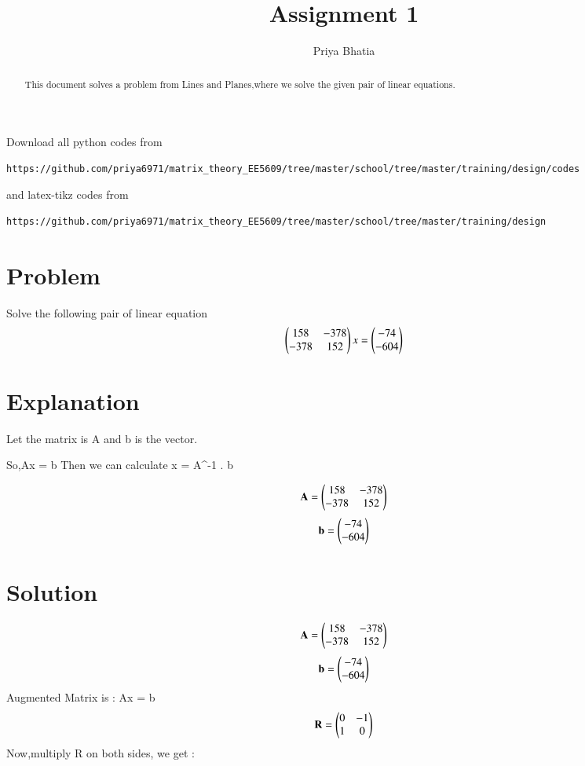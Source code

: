\documentclass[journal,12pt,twocolumn]{IEEEtran}
\begin{document}
     \def\rightbox#1{\makebox[0in][r]{#1}}
     \def\centbox#1{\makebox[0in]{#1}}
     \def\topbox#1{\raisebox{-\baselineskip}[0in][0in]{#1}}
     \def\midbox#1{\raisebox{-0.5\baselineskip}[0in][0in]{#1}}
\vspace{3cm}
\title{Assignment 1}
\author{Priya Bhatia}
\maketitle
\newpage
\bigskip
\renewcommand{\thefigure}{\theenumi}
\renewcommand{\thetable}{\theenumi}
\begin{abstract}
This document solves a problem from Lines and Planes,where we solve the given pair of linear equations.
\end{abstract}
Download all python codes from 
\begin{lstlisting}
https://github.com/priya6971/matrix_theory_EE5609/tree/master/school/tree/master/training/design/codes
\end{lstlisting}
%
and latex-tikz codes from 
%
\begin{lstlisting}
https://github.com/priya6971/matrix_theory_EE5609/tree/master/school/tree/master/training/design
\end{lstlisting}
%
\section{Problem}
Solve the following pair of linear equation 
\begin{align}
\begin{pmatrix}  158 & -378 \\ -378 & 152\end{pmatrix} x =
\begin{pmatrix}  -74 \\ -604\end{pmatrix}
\end{align}
\section{Explanation}
Let the matrix is A and b is the vector.

So,Ax = b
Then we can calculate x = A^{-1} . b 

\begin{align}
\mathbf{A} = \begin{pmatrix}158 & -378 \\ -378 & 152\end{pmatrix}
\end{align}
\begin{align}
\mathbf{b} = \begin{pmatrix}-74 \\ -604\end{pmatrix} 
\end{align}
\section{Solution}
\begin{align}
\mathbf{A} = \begin{pmatrix}158 & -378 \\ -378 & 152\end{pmatrix}
\end{align}
\begin{align}
\mathbf{b} = \begin{pmatrix}-74 \\ -604\end{pmatrix} 
\end{align}
Augmented Matrix is : Ax = b 
\begin{align}
\mathbf{R} = \begin{pmatrix}  0 & -1 \\ 
1 & 0\end{pmatrix}
\end{align}
Now,multiply R on both sides, we get :
\end{document}

